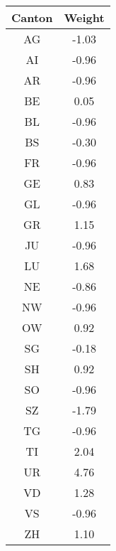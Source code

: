 \begin{tabular}{|c|c|}
\toprule
Canton & Weight \\
\midrule
    AG &  -1.03 \\
    AI &  -0.96 \\
    AR &  -0.96 \\
    BE &   0.05 \\
    BL &  -0.96 \\
    BS &  -0.30 \\
    FR &  -0.96 \\
    GE &   0.83 \\
    GL &  -0.96 \\
    GR &   1.15 \\
    JU &  -0.96 \\
    LU &   1.68 \\
    NE &  -0.86 \\
    NW &  -0.96 \\
    OW &   0.92 \\
    SG &  -0.18 \\
    SH &   0.92 \\
    SO &  -0.96 \\
    SZ &  -1.79 \\
    TG &  -0.96 \\
    TI &   2.04 \\
    UR &   4.76 \\
    VD &   1.28 \\
    VS &  -0.96 \\
    ZH &   1.10 \\
\bottomrule
\end{tabular}
